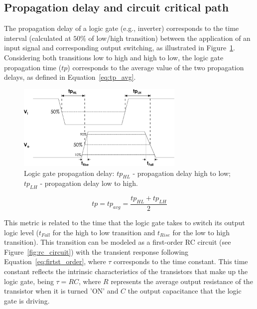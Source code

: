 


\subsection{Propagation delay and circuit critical path}

The propagation delay of a logic gate (e.g., inverter) corresponds to the time interval (calculated at $50\%$ of low/high transition) between the application of an input signal and corresponding output switching, as illustrated in Figure~\ref{fig:tp}. Considering both transitions low to high and high to low, the logic gate propagation time ($tp$) corresponds to the average value of the two propagation delays, as defined in Equation~\ref{eq:tp_avg}.

\begin{figure}[htb]
    \centering
    \includegraphics[width=80mm]{Figures/Background/propagation_delay.pdf}
    \caption{Logic gate propagation delay: $tp_{HL}$ - propagation delay high to low; $tp_{LH}$ - propagation delay low to high.}
    \label{fig:tp}
\end{figure}

\begin{equation}
    tp = tp_{avg} = \frac{tp_{HL}+tp_{LH}}{2}
    \label{eq:tp_avg}
\end{equation}

This metric is related to the time that the logic gate takes to switch its output logic level ($t_{Fall}$ for the high to low transition and $t_{Rise}$ for the low to high transition). This transition can be modeled as a first-order RC circuit (see Figure~\ref{fig:rc_circuit}) with the transient response following Equation~\ref{eq:firtst_order}, where $\tau$ corresponds to the time constant. This time constant reflects the intrinsic characteristics of the transistors that make up the logic gate, being $\tau=RC$, where $R$ represents the average output resistance of the transistor when it is turned 'ON' and $C$ the output capacitance that the logic gate is driving.



